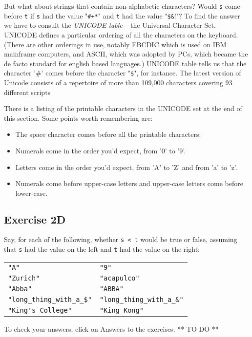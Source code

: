 But what about strings that contain non-alphabetic characters?   Would  \verb!s!
come before \verb!t! if  \verb!s! had the value "\verb!#+*!" and \verb!t! had the
value "\verb!$&!!"?  To find the answer we have to consult the
\emph{UNICODE table} -- the Universal Character Set.
UNICODE
defines a particular ordering of all the characters
on the keyboard.  (There are other orderings in use, notably EBCDIC which
is used on IBM mainframe computers,  and ASCII, which was adopted by PCs,
which became the de facto standard for english based languages.)   UNICODE table tells us that the
character '\#' comes before the character "\verb!$!", for instance.
The latest version of Unicode consists of a repertoire of more than 109,000 characters covering 93 different scripts

There is a listing of the printable characters in the UNICODE set at the
end of this section.  Some points worth remembering are:

\begin{itemize}
\item
The space character comes before all the printable characters.
\item
Numerals come in the order you'd expect, from '0' to '9'.
\item
Letters come in the order you'd expect, from 'A' to 'Z' and from 'a' to 'z'.
\item
Numerals come before upper-case letters and upper-case letters come before lower-case.
\end{itemize}

\subsection*{Exercise 2D}

Say, for each of the following, whether \verb!s < t! would be
true or false, assuming that  \verb!s! had the value on the left and \verb!t!
had the value on the right:

\begin{tabular}{ll}
\verb!"A"! & \verb!"9"!\\
\verb!"Zurich"! & \verb!"acapulco"!\\
\verb!"Abba"! & \verb!"ABBA"!\\
\verb!"long_thing_with_a_$"! & \verb!"long_thing_with_a_&"!\\
\verb!"King's College"! & \verb!"King Kong"!\\
\end{tabular}

To check your answers, click on  Answers to the exercises. ** TO DO **

